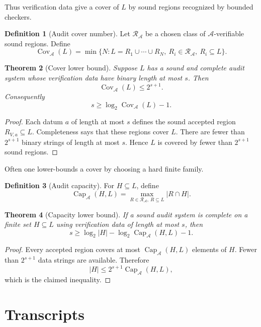 \documentclass[11pt]{article}
\newtheorem{theorem}{Theorem}[section]
\theoremstyle{definition}
\newtheorem{definition}[theorem]{Definition}
\DeclareMathOperator{\AudCap}{Cap}
\DeclareMathOperator{\Cov}{Cov}
\begin{document}
Thus verification data give a cover of \(L\) by sound regions recognized by bounded checkers.

\begin{definition}[Audit cover number]
Let \(\mathcal R_{\mathcal A}\) be a chosen class of \(\mathcal A\)-verifiable sound regions. Define
\[
\Cov_{\mathcal A}(L)
=
\min\{N:L=R_1\cup\cdots\cup R_N,\ R_i\in\mathcal R_{\mathcal A},\ R_i\subseteq L\}.
\]
\end{definition}

\begin{theorem}[Cover lower bound]
Suppose \(L\) has a sound and complete audit system whose verification data have binary length at most \(s\). Then
\[
\Cov_{\mathcal A}(L)\leq 2^{s+1}.
\]
Consequently
\[
s\geq \log_2\Cov_{\mathcal A}(L)-1.
\]
\end{theorem}

\begin{proof}
Each datum \(a\) of length at most \(s\) defines the sound accepted region \(R_{V,a}\subseteq L\). Completeness says that these regions cover \(L\). There are fewer than \(2^{s+1}\) binary strings of length at most \(s\). Hence \(L\) is covered by fewer than \(2^{s+1}\) sound regions.
\end{proof}

Often one lower-bounds a cover by choosing a hard finite family.

\begin{definition}[Audit capacity]
For \(H\subseteq L\), define
\[
\AudCap_{\mathcal A}(H,L)
=
\max_{R\in\mathcal R_{\mathcal A},\ R\subseteq L}|R\cap H|.
\]
\end{definition}

\begin{theorem}[Capacity lower bound]
If a sound audit system is complete on a finite set \(H\subseteq L\) using verification data of length at most \(s\), then
\[
s\geq
\log_2 |H|-\log_2\AudCap_{\mathcal A}(H,L)-1.
\]
\end{theorem}

\begin{proof}
Every accepted region covers at most \(\AudCap_{\mathcal A}(H,L)\) elements of \(H\). Fewer than \(2^{s+1}\) data strings are available. Therefore
\[
|H|\leq 2^{s+1}\AudCap_{\mathcal A}(H,L),
\]
which is the claimed inequality.
\end{proof}

\section{Transcripts}
\end{document}
